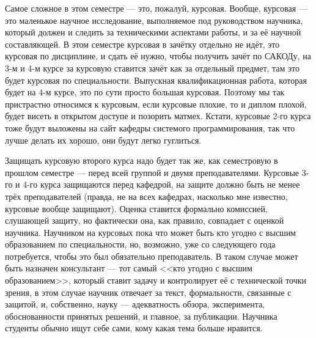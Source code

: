 \documentclass[a5paper]{article}
\begin{document}
Самое сложное в этом семестре --- это, пожалуй, курсовая. Вообще, курсовая --- это маленькое научное исследование, выполняемое под руководством научника, который должен и следить за техническими аспектами работы, и за её научной составляющей. В этом семестре курсовая в зачётку отдельно не идёт, это курсовая по дисциплине, и сдать её нужно, чтобы получить зачёт по САКОДу, на 3-м и 4-м курсе за курсовую ставится зачёт как за отдельный предмет, там это будет курсовая по специальности. Выпускная квалификационная работа, которая будет на 4-м курсе, это по сути просто большая курсовая. Поэтому мы так пристрастно относимся к курсовым, если курсовые плохие, то и диплом плохой, будет висеть в открытом доступе и позорить матмех. Кстати, курсовые 2-го курса тоже будут выложены на сайт кафедры системого программирования, так что лучше делать их хорошо, они будут легко гуглиться. 

Защищать курсовую второго курса надо будет так же, как семестровую в прошлом семестре --- перед всей группой и двумя преподавателями. Курсовые 3-го и 4-го курса защищаются перед кафедрой, на защите должно быть не менее трёх преподавателей (правда, не на всех кафедрах, насколько мне известно, курсовые вообще защищают). Оценка ставится формально комиссией, слушающей защиту, но фактически она, как правило, совпадает с оценкой научника. Научником на курсовых пока что может быть кто угодно с высшим образованием по специальности, но, возможно, уже со следующего года потребуется, чтобы это был обязательно преподаватель. В таком случае может быть назначен консультант --- тот самый <<кто угодно с высшим образованием>>, который ставит задачу и контролирует её с технической точки зрения, в этом случае научник отвечает за текст, формальности, связанные с защитой, и, собственно, науку --- адекватность обзора, эксперимента, обоснованности принятых решений, и главное, за публикации. Научника студенты обычно ищут себе сами, кому какая тема больше нравится.
\end{document}

